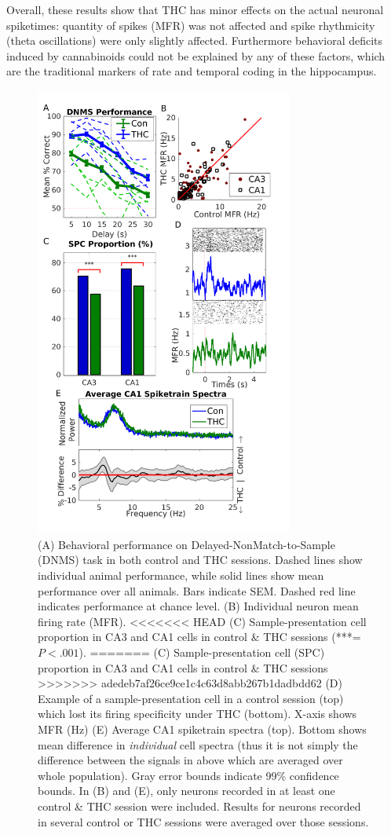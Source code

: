 \documentclass[11pt,a4paper,final]{article}
\begin{document}
Overall, these results show that THC has minor effects on the actual neuronal spiketimes: quantity of spikes (MFR) was not affected and spike rhythmicity (theta oscillations) were only slightly affected.
Furthermore behavioral deficits induced by cannabinoids could not be explained by any of these factors, which are the traditional markers of rate and temporal coding in the hippocampus.

\begin{figure}[!ht]
\centering
\includegraphics[width=85mm]{sig}
\caption[Signal Analysis]{
(A) Behavioral performance on Delayed-NonMatch-to-Sample (DNMS) task in both control and THC sessions. Dashed lines show individual animal performance, while solid lines show mean performance over all animals. Bars indicate SEM. Dashed red line indicates performance at chance level.
(B) Individual neuron mean firing rate (MFR).
<<<<<<< HEAD
(C) Sample-presentation cell proportion in CA3 and CA1 cells in control \& THC sessions (***=$P<.001$). 
=======
(C) Sample-presentation cell (SPC) proportion in CA3 and CA1 cells in control \& THC sessions
>>>>>>> adedeb7af26ce9ce1c4c63d8abb267b1dadbdd62
(D) Example of a sample-presentation cell in a control session (top) which lost its firing specificity under THC (bottom). X-axis shows MFR (Hz)
(E) Average CA1 spiketrain spectra (top). Bottom shows mean difference in \textit{individual} cell spectra (thus it is not simply the difference between the signals in above which are averaged over whole population). Gray error bounds indicate 99\% confidence bounds.
In (B) and (E), only neurons recorded in at least one control \& THC session were included. Results for neurons recorded in several control or THC sessions were averaged over those sessions.}
\label{sig}
\end{figure}
\end{document}
